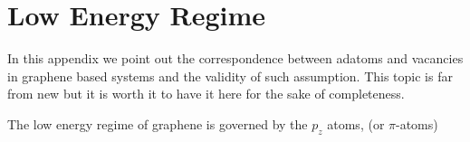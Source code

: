 \chapter{Low Energy Regime}
In this appendix we point out the correspondence between adatoms and vacancies in graphene based systems and the validity of such assumption. This topic is far from new\cite{} but it is worth it to have it here for the sake of completeness.

The low energy regime of graphene is governed by the $p_z$ atoms, (or $\pi$-atoms)
